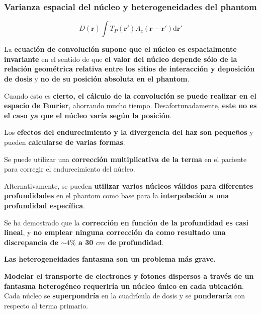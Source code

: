 \documentclass[aspectratio=169,xcolor=dvipsnames,t]{beamer}
\newcommand{\be}{\begin{equation*}}
\newcommand{\ee}{\end{equation*}}
\begin{document}
\begin{frame}

    \frametitle{Varianza espacial del núcleo y heterogeneidades del phantom}

    \be
    D(\mathbf{r}) \int T_P(\mathbf{r'}) A_c (\mathbf{r}-\mathbf{r'}) \text{d}\mathbf{r'}
    \ee

    La \textbf{ecuación de convolución supone que el núcleo es espacialmente invariante} en el sentido de que \textbf{el valor del núcleo depende sólo de la relación geométrica relativa entre los sitios de interacción y deposición de dosis} y \textbf{no de su posición absoluta en el phantom}.

    Cuando esto es \textbf{cierto, el cálculo de la convolución se puede realizar en el espacio de Fourier}, ahorrando mucho tiempo. Desafortunadamente, \textbf{este no es el caso ya que el núcleo varía según la posición}.

    Los \textbf{efectos del endurecimiento y la divergencia del haz son pequeños} y pueden \textbf{calcularse de varias formas}. 

\end{frame}

\begin{frame}

    Se puede utilizar una \textbf{corrección multiplicativa de la terma} en el paciente para corregir el endurecimiento del núcleo.

    Alternativamente, se pueden \textbf{utilizar varios núcleos válidos para diferentes profundidades} en el phantom como base para la \textbf{interpolación a una profundidad específica}. 

    Se ha demostrado que la \textbf{corrección en función de la profundidad es casi lineal}, y \textbf{no emplear ninguna corrección da como resultado una discrepancia de $\sim4\%$ a 30 $cm$ de profundidad}.

    \textbf{Las heterogeneidades fantasma son un problema más grave.}

    \textbf{Modelar el transporte de electrones y fotones dispersos a través de un fantasma heterogéneo requeriría un núcleo único en cada ubicación}. Cada núcleo se \textbf{superpondría} en la cuadrícula de dosis y se \textbf{ponderaría} con respecto al terma primario.

\end{frame}
\end{document}
